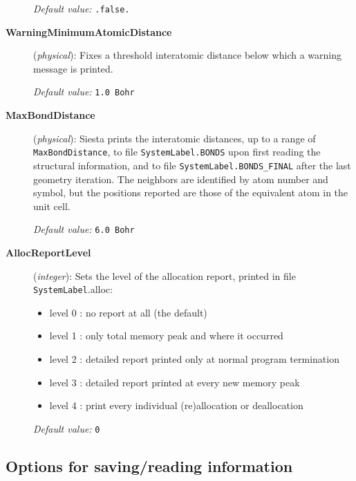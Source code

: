 \documentclass[11pt]{article}
\begin{document}
\begin{description}
{\it Default value:} {\tt .false.}

\item[{\bf WarningMinimumAtomicDistance}] ({\it physical}): 
Fixes a threshold interatomic distance below which a warning
message is printed.

{\it Default value:} {\tt 1.0 Bohr}

\item[{\bf MaxBondDistance}] ({\it physical}): 
{\sc Siesta} prints the interatomic
distances, up to
a range of {\tt MaxBondDistance}, to file 
{\tt SystemLabel.BONDS} upon first
reading the structural information, and to file
{\tt SystemLabel.BONDS\_FINAL}
after the last geometry iteration. The neighbors are identified by
atom number and symbol, but the positions reported are those of the
equivalent atom in the unit cell.

{\it Default value:} {\tt 6.0 Bohr}

        
\item[{\bf AllocReportLevel}] ({\it integer}): 
Sets the level of the allocation report, printed in file 
{\tt SystemLabel}.alloc:
\begin{itemize}
\item
  level 0 : no report at all (the default)
\item
  level 1 : only total memory peak and where it occurred
\item
  level 2 : detailed report printed only at 
            normal program termination
\item
  level 3 : detailed report printed at every new memory peak
\item
  level 4 : print every individual (re)allocation or deallocation
\end{itemize}

{\it Default value:} {\tt 0}

\end{description}



\vspace{5pt}
\subsection{Options for saving/reading information}
\end{document}
